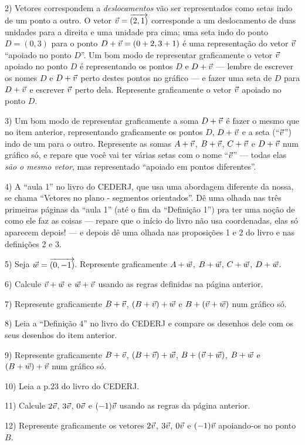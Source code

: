 \documentclass[oneside]{book}
\begin{document}
2) Vetores correspondem a {\sl deslocamentos} vão ser representados
como setas indo de um ponto a outro. O vetor ${\vec v}={\overrightarrow{(2,1)}}$
corresponde a um deslocamento de duas unidades para a direita e uma
unidade pra cima; uma seta indo do ponto $D=(0,3)$ para o ponto
$D+{\vec v}=(0+2,3+1)$ é uma representação do vetor ${\vec v}$ ``apoiado no
ponto $D$''. Um bom modo de representar graficamente o vetor ${\vec v}$
apoiado no ponto $D$ é representando os pontos $D$ e $D+{\vec v}$ ---
lembre de escrever os nomes $D$ e $D+{\vec v}$ perto destes pontos no
gráfico --- e fazer uma seta de $D$ para $D+{\vec v}$ e escrever ${\vec v}$
perto dela. Represente graficamente o vetor ${\vec v}$ apoiado no ponto
$D$.

3) Um bom modo de representar graficamente a soma $D+{\vec v}$ é fazer o
mesmo que no item anterior, representando graficamente os pontos $D$,
$D+{\vec v}$ e a seta (``${\vec v}$'') indo de um para o outro. Represente as
somas $A+{\vec v}$, $B+{\vec v}$, $C+{\vec v}$ e $D+{\vec v}$ num gráfico só, e repare que
você vai ter várias setas com o nome ``${\vec v}$'' --- todas elas {\sl são
  o mesmo vetor}, mas representado ``apoiado em pontos diferentes''.

4) A ``aula 1'' no livro do CEDERJ, que usa uma abordagem diferente da
nossa, se chama ``Vetores no plano - segmentos orientados''. Dê uma
olhada nas três primeiras páginas da ``aula 1'' (até o fim da
``Definição 1'') pra ter uma noção de como ele faz as coisas ---
repare que o início do livro não usa coordenadas, elas só aparecem
depois! --- e depois dê uma olhada nas proposições 1 e 2 do livro e
nas definições 2 e 3.

5) Seja ${\vec w}={\overrightarrow{(0,-1)}}$. Represente graficamente $A+{\vec w}$, $B+{\vec w}$,
$C+{\vec w}$, $D+{\vec w}$.

6) Calcule ${\vec v}+{\vec w}$ e ${\vec w}+{\vec v}$ usando as regras definidas na página
anterior.

7) Represente graficamente $B+{\vec v}$, $(B+{\vec v})+{\vec w}$ e $B+({\vec v}+{\vec w})$ num
gráfico só.

8) Leia a ``Definição 4'' no livro do CEDERJ e compare os desenhos
dele com os seus desenhos do item anterior.

9) Represente graficamente $B+{\vec v}$, $(B+{\vec v})+{\vec w}$, $B+({\vec v}+{\vec w})$,
$B+{\vec w}$ e $(B+{\vec w})+{\vec v}$ num gráfico só.

10) Leia a p.23 do livro do CEDERJ.

11) Calcule $2{\vec v}$, $3{\vec v}$, $0{\vec v}$ e $(-1){\vec v}$ usando as regras da
página anterior.

12) Represente graficamente os vetores $2{\vec v}$, $3{\vec v}$, $0{\vec v}$ e
$(-1){\vec v}$ apoiando-os no ponto $B$.
\end{document}
